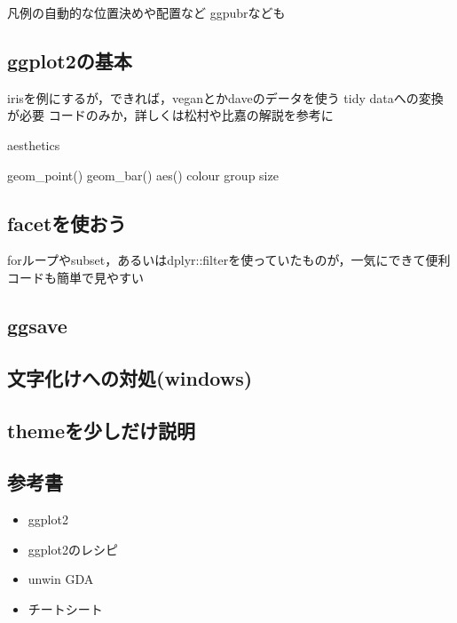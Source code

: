 \documentclass[
]{article}
\providecommand{\tightlist}{%
  \setlength{\itemsep}{0pt}\setlength{\parskip}{0pt}}
\begin{document}
凡例の自動的な位置決めや配置など
ggpubrなども

\hypertarget{ggplot2ux306eux57faux672c}{%
\subsection{ggplot2の基本}\label{ggplot2ux306eux57faux672c}}

irisを例にするが，できれば，veganとかdaveのデータを使う
tidy dataへの変換が必要
コードのみか，詳しくは松村や比嘉の解説を参考に

aesthetics

geom\_point()
geom\_bar()
aes()
colour
group
size

\hypertarget{facetux3092ux4f7fux304aux3046}{%
\subsection{facetを使おう}\label{facetux3092ux4f7fux304aux3046}}

forループやsubset，あるいはdplyr::filterを使っていたものが，一気にできて便利
コードも簡単で見やすい

\hypertarget{ggsave}{%
\subsection{ggsave}\label{ggsave}}

\hypertarget{ux6587ux5b57ux5316ux3051ux3078ux306eux5bfeux51e6windows}{%
\subsection{文字化けへの対処(windows)}\label{ux6587ux5b57ux5316ux3051ux3078ux306eux5bfeux51e6windows}}

\hypertarget{themeux3092ux5c11ux3057ux3060ux3051ux8aacux660e}{%
\subsection{themeを少しだけ説明}\label{themeux3092ux5c11ux3057ux3060ux3051ux8aacux660e}}

\hypertarget{ux53c2ux8003ux66f8}{%
\subsection{参考書}\label{ux53c2ux8003ux66f8}}

\begin{itemize}
\tightlist
\item
  ggplot2
\item
  ggplot2のレシピ
\item
  unwin GDA
\item
  チートシート
\end{itemize}
\end{document}
